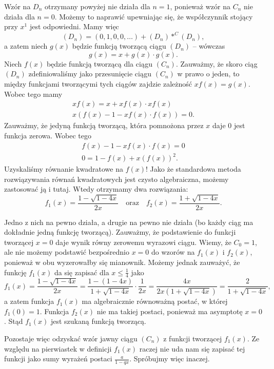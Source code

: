 \documentclass[shortabstract]{imthesis}
\begin{document}
    Wzór na $D_n$ otrzymany powyżej nie działa dla $n = 1$, ponieważ wzór na $C_n$ nie działa dla $n = 0$. Możemy to naprawić upewniając się, że współczynnik stojący przy $x^1$ jest odpowiedni. Mamy więc
    $$
    (D_n) = (0, 1, 0, 0, \ldots) + (D_n) *^C (D_n),
    $$
    a zatem niech $g(x)$ będzie funkcją tworzącą ciągu $(D_n)$ -- wówczas
    $$
    g(x) = x + g(x) \cdot g(x).
    $$
    Niech $f(x)$ będzie funkcją tworzącą dla ciągu $(C_n)$. Zauważmy, że skoro ciąg $(D_n)$ zdefiniowaliśmy jako przesunięcie ciągu $(C_n)$ w prawo o jeden, to między funkcjami tworzącymi tych ciągów zajdzie zależność $xf(x) = g(x)$. Wobec tego mamy
    \begin{gather*}
    xf(x) = x + xf(x) \cdot xf(x) \\
    x\left(f(x) - 1 - xf(x) \cdot f(x)\right) = 0.
    \end{gather*}
    Zauważmy, że jedyną funkcją tworzącą, która pomnożona przez $x$ daje $0$ jest funkcja zerowa. Wobec tego
    \begin{gather*}
    f(x) - 1 - xf(x) \cdot f(x) = 0 \\
    0 = 1 - f(x) + x (f(x))^2.
    \end{gather*}
    Uzyskaliśmy równanie kwadratowe na $f(x)$! Jako że standardowa metoda rozwiązywania równań kwadratowych jest czysto algebraiczna, możemy zastosować ją i tutaj. Wtedy otrzymamy dwa rozwiązania:
    $$
    f_1(x) = \frac{1-\sqrt{1-4x}}{2x}
    \quad \text{oraz} \quad
    f_2(x) = \frac{1+\sqrt{1-4x}}{2x}.
    $$

    Jedno z nich na pewno działa, a drugie na pewno nie działa (bo każdy ciąg ma dokładnie jedną funkcję tworzącą). Zauważmy, że podstawienie do funkcji tworzącej $x = 0$ daje wynik równy zerowemu wyrazowi ciągu. Wiemy, że $C_0 = 1$, ale nie możemy podstawić bezpośrednio $x = 0$ do wzorów na $f_1(x)$ i $f_2(x)$, ponieważ w obu wyzerowałby się mianownik. Możemy jednak zauważyć, że funkcję $f_1(x)$ da się zapisać dla $x \leq \frac14$ jako
    $$
    f_1(x) = \frac{1-\sqrt{1-4x}}{2x} = \frac{1-(1-4x)}{1+\sqrt{1-4x}} \cdot \frac{1}{2x} = \frac{4x}{2x(1+\sqrt{1-4x})} = \frac{2}{1+\sqrt{1-4x}},
    $$
    a zatem funkcja $f_1(x)$ ma algebraicznie równoważną postać, w której $f_1(0) = 1$. Funkcja $f_2(x)$ nie ma takiej postaci, ponieważ ma asymptotę $x = 0$. Stąd $f_1(x)$ jest szukaną funkcją tworzącą. 
    
    Pozostaje więc odzyskać wzór jawny ciągu $(C_n)$ z funkcji tworzącej $f_1(x)$. Ze względu na pierwiastek w definicji $f_1(x)$ raczej nie uda nam się zapisać tej funkcji jako sumy wyrażeń postaci $\frac{a}{1-qx}$. Spróbujmy więc inaczej.
    
\end{document}
